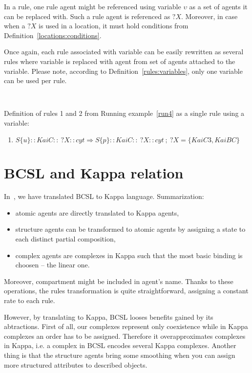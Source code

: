 \documentclass{elsarticle}
\begin{document}
In a rule, one rule agent might be referenced using variable $\upsilon$ as a set of agents it can be replaced with. Such a rule agent is referenced as $?X$. Moreover, in case when a $?X$ is used in a location, it must hold conditions from Definition~\ref{locations:conditions}.

Once again, each rule associated with variable can be easily rewritten as several rules where variable is replaced with agent from set of agents attached to the variable. Please note, according to Definition~\ref{rules:variables}, only one variable can be used per rule.

\begin{running_example}\label{run5}
$ $

\noindent Definition of rules 1 and 2 from Running example~\ref{run4} as a single rule using a variable:
\begin{enumerate}
\item $S\{u\}::KaiC::~?X::cyt \Rightarrow S\{p\}::KaiC::~?X::cyt ~;~ ?X = \{KaiC3, KaiBC\} $
\end{enumerate}
\end{running_example}

\section{BCSL and Kappa relation}

\noindent In~\cite{Ded201627}, we have translated BCSL to Kappa language. Summarization:

\begin{itemize}
	\item atomic agents are directly translated to Kappa agents,
	\item structure agents can be transformed to atomic agents by assigning a state to each distinct partial composition,
	\item complex agents are complexes in Kappa such that the most basic binding is choosen -- the linear one.
\end{itemize}

Moreover, compartment might be included in agent's name. Thanks to these operations, the rules transformation is quite straightforward, assigning a constant rate to each rule.

However, by translating to Kappa, BCSL looses benefits gained by its abtractions. First of all, our complexes represent only coexistence while in Kappa complexes an order has to be assigned. Therefore it overapproximates complexes in Kappa, i.e. a complex in BCSL encodes several Kappa complexes. Another thing is that the structure agents bring some smoothing when you can assign more structured attributes to described objects.
\end{document}
